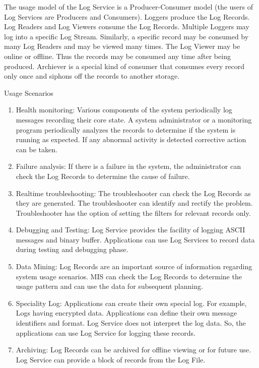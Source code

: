 \begin{flushleft}
The usage model of the Log Service is a Producer-Consumer model (the users of Log Services are Producers and Consumers). Loggers produce the Log Records.
Log Readers and Log Viewers consume the Log Records. Multiple Loggers may log into a specific Log Stream. Similarly, a specific record may be 
consumed by many Log Readers and may be viewed many times. The Log Viewer may be online or offline. Thus the records may be consumed any time after
being produced. Archiever is a special kind of consumer that consumes every record only once and siphons off the records to another storage.
\begin{Desc}
\item[Usage Scenarios] 
\begin{enumerate}
\item Health monitoring: Various components of the system periodically log messages recording their core state. A system administrator or a monitoring
program periodically analyzes the records to determine if the system is running as expected. If any abnormal activity is detected corrective action can be
taken.
\item Failure analysis: If there is a failure in the system, the administrator can check the Log Records to determine the cause of failure.
\item Realtime troubleshooting: The troubleshooter can check the Log Records as they are generated. The troubleshooter can identify and rectify the problem.
Troubleshooter has the option of setting the filters for relevant records only.
\item Debugging and Testing: Log Service provides the facility of logging ASCII messages and binary buffer. Applications can use Log Services to record 
data during testing and debugging phase.
\item Data Mining: Log Records are an important source of information regarding system usage scenarios. MIS can check the Log Records to determine 
the usage pattern and can use the data for subsequent planning.   
\item 	Speciality Log: Applications can create their own special log. For example, Logs having encrypted data. Applications can define their own message 
identifiers and format. Log Service does not interpret the log data. So, the applications can use Log Service for logging these records.
\item Archiving: Log Records can be archived for offline viewing or for future use. Log Service can provide a block of records from the Log File.
\end{enumerate}
\end{Desc}


\end{flushleft}
